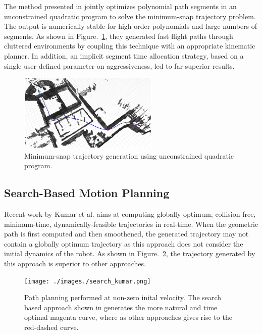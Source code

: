 The method presented in  \cite{richter2016polynomial} jointly optimizes polynomial path segments in an unconstrained quadratic program to solve the minimum-snap trajectory problem. The output is numerically stable for high-order polynomials and large numbers of segments. As shown in Figure.~\ref{fig:bry_poly}, they generated fast flight paths through cluttered environments by coupling this technique with an appropriate kinematic planner. In addition, an implicit segment time allocation strategy, based on a single user-defined parameter on aggressiveness, led to far superior results.

\begin{figure}
\centering
\includegraphics[width=0.6\textwidth]{./images/bry_poly.png}
\caption[Minimum-snap trajectory generation using unconstrained quadratic program]{Minimum-snap trajectory generation using unconstrained quadratic program. \cite{richter2016polynomial}}
\label{fig:bry_poly}
\end{figure}


\subsection{Search-Based Motion Planning}
\label{sec:search_based_planning}
Recent work by Kumar et al. \cite{kumar2017search} aims at computing globally optimum, collision-free, minimum-time, dynamically-feasible trajectories in real-time. When the geometric path is first computed and then smoothened, the generated trajectory may not contain a globally optimum trajectory as this approach does not consider the initial dynamics of the robot. As shown in Figure.~\ref{fig:search_kumar}, the trajectory generated by this approach is superior to other approaches. 

\begin{figure}[h!]
\centering
\texttt{[image: ./images./search\_kumar.png]}
\caption[Path planning performed at non-zero inital velocity.]{Path planning performed at non-zero inital velocity. The search based approach shown in \cite{kumar2017search} generates the more natural and time optimal magenta curve, where as other approaches gives rise to the red-dashed curve.}
\label{fig:search_kumar}
\end{figure}

